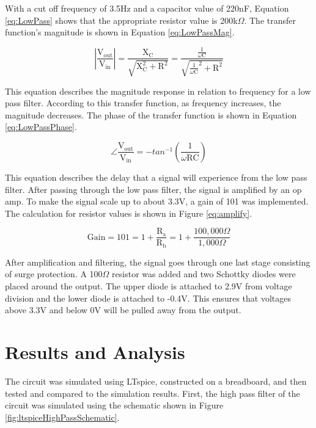 \documentclass[CMPE]{KGCOEReport}
\begin{document}
With a cut off frequency of 3.5Hz and a capacitor value of 220nF, Equation \ref{eq:LowPass} shows that the appropriate resistor value is 200k$\Omega$. The transfer function's magnitude is shown in Equation \ref{eq:LowPassMag}.

\begin{equation}
|\frac{\text{V}_\text{out}}{\text{V}_\text{in}}| = \frac{\text{X}_\text{C}}{\sqrt{\text{X}_\text{C}^2 + \text{R}^2}} = \frac{\frac{1}{\omega\text{C}}}{\sqrt{\frac{1}{\omega\text{C}}^2 + \text{R}^2}} \label{eq:LowPassMag}
\end{equation}

This equation describes the magnitude response in relation to frequency for a low pass filter. According to this transfer function, as frequency increases, the magnitude decreases. The phase of the transfer function is shown in Equation \ref{eq:LowPassPhase}. 

\begin{equation}
\angle\frac{\text{V}_\text{out}}{\text{V}_\text{in}} = -tan^{-1}(\frac{1}{\omega\text{R}\text{C}}) \label{eq:LowPassPhase}
\end{equation}

This equation describes the delay that a signal will experience from the low pass filter. After passing through the low pass filter, the signal is amplified by an op amp. To make the signal scale up to about 3.3V, a gain of 101 was implemented. The calculation for resistor values is shown in Figure \ref{eq:amplify}. 

\begin{equation}
\text{Gain} = 101 = 1 + \frac{\text{R}_\text{a}}{\text{R}_\text{b}} = 1 + \frac{100,000\Omega}{1,000\Omega} \label{eq:amplify}
\end{equation}

After amplification and filtering, the signal goes through one last stage consisting of surge protection. A 100$\Omega$ resistor was added and two Schottky diodes were placed around the output. The upper diode is attached to 2.9V from voltage division and the lower diode is attached to -0.4V. This ensures that voltages above 3.3V and below 0V will be pulled away from the output.

\section*{Results and Analysis}

The circuit was simulated using LTspice, constructed on a breadboard, and then tested and compared to the simulation results. First, the high pass filter of the circuit was simulated using the schematic shown in Figure \ref{fig:ltspiceHighPassSchematic}.
\end{document}
